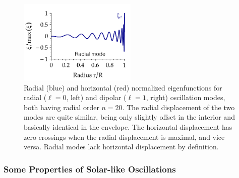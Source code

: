 \begin{figure}
    \centering
    \includegraphics[width=0.5\textwidth]{figs/pulse/eig-radial.pdf}%
    \caption[Eigenfunctions]{Radial (blue) and horizontal (red) normalized eigenfunctions for radial (${\ell=0}$, left) and dipolar (${\ell=1}$, right) oscillation modes, both having radial order ${n=20}$. 
    The radial displacement of the two modes are quite similar, being only slightly offset in the interior and basically identical in the envelope. 
    The horizontal displacement has zero crossings when the radial displacement is maximal, and vice versa. 
    Radial modes lack horizontal displacement by definition. 
    \label{fig:eigenfunctions}}
\end{figure}



\subsubsection*{Some Properties of Solar-like Oscillations}


